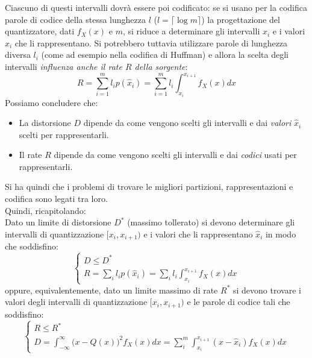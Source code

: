 Ciascuno di questi intervalli dovr\`a essere poi codificato: se si usano per la codifica parole di codice della stessa lunghezza $l$ ($l = \lceil \log m \rceil$) la progettazione del quantizzatore, dati $f_X(x)$ e $m$, si riduce a determinare gli intervalli $x_i$ e i valori $\hat{x}_i$ che li rappresentano. Si potrebbero tuttavia utilizzare parole di lunghezza diversa $l_i$ (come ad esempio nella codifica di Huffman) e allora la scelta degli intervalli \textit{influenza anche il rate $R$ della sorgente}:
\begin{equation}
    R = \sum_{i=1}^m l_i p(\hat{x}_i) = \sum_{i=1}^m l_i \int_{x_i}^{x_{i+1}} f_X(x) dx
\end{equation}
Possiamo concludere che:
\begin{itemize}
    \item La distorsione $D$ dipende da come vengono scelti gli intervalli e dai \textit{valori} $\hat{x}_i$ scelti per rappresentarli.
    \item Il rate $R$ dipende da come vengono scelti gli intervalli e dai \textit{codici} usati per rappresentarli.
\end{itemize}
Si ha quindi che i problemi di trovare le migliori partizioni, rappresentazioni e codifica sono legati tra loro. \\
Quindi, ricapitolando: \\
Dato un limite di distorsione $D^*$ (massimo tollerato) si devono determinare gli intervalli di quantizzazione $[x_i, x_{i+1})$ e i valori che li rappresentano $\hat{x}_i$ in modo che soddisfino:
\begin{equation}
    \begin{cases}
    D \leq D^* \\
    R = \sum_{i} l_i p(\hat{x}_i) = \sum_i l_i \int_{x_i}^{x_{i+1}} f_X(x) dx
    \end{cases}
\end{equation}
oppure, equivalentemente, dato un limite massimo di rate $R^*$ si devono trovare i valori degli intervalli di quantizzazione $[x_i, x_{i+1})$ e le parole di codice tali che soddisfino:
\begin{equation}
    \begin{cases}
    R \leq R^* \\
    D = \int_{-\infty}^{\infty} \Big ( x - Q(x) \Big )^2 f_X(x) dx = \sum_{i}^m \int_{x_i}^{x_{i+1}} (x - \hat{x}_i) f_X(x) dx
    \end{cases}
\end{equation}
